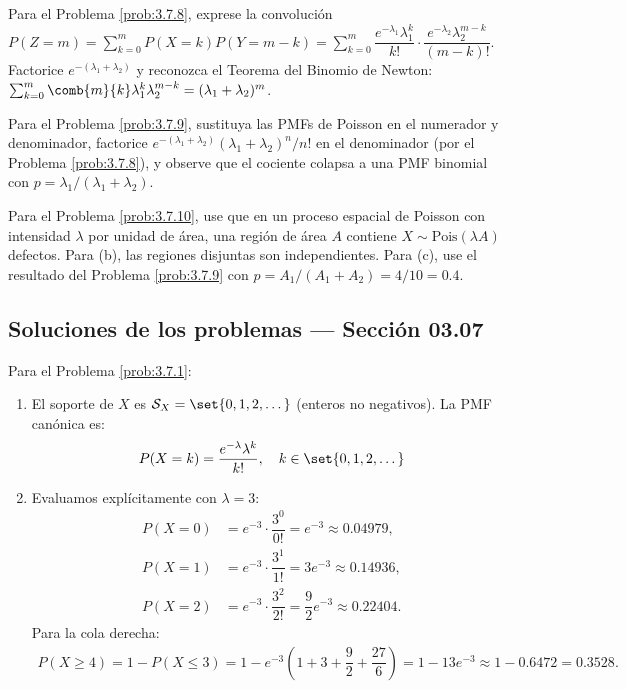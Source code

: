 \begin{sugerencia}
	\label{sug:3.7.8}
	Para el Problema \ref{prob:3.7.8}, exprese la convolución $P(Z = m) = \sum_{k=0}^{m} P(X=k) P(Y=m-k) = \sum_{k=0}^{m} \dfrac{e^{-\lambda_{1}} \lambda_{1}^{k}}{k!} \cdot \dfrac{e^{-\lambda_{2}} \lambda_{2}^{m-k}}{(m-k)!}$. Factorice $e^{-(\lambda_{1}+\lambda_{2})}$ y reconozca el Teorema del Binomio de Newton: $\sum_{k=0}^{m} \comb{m}{k} \lambda_{1}^{k} \lambda_{2}^{m-k} = (\lambda_{1} + \lambda_{2})^{m}$.
\end{sugerencia}

\begin{sugerencia}
	\label{sug:3.7.9}
	Para el Problema \ref{prob:3.7.9}, sustituya las PMFs de Poisson en el numerador y denominador, factorice $e^{-(\lambda_{1}+\lambda_{2})}(\lambda_{1}+\lambda_{2})^{n}/n!$ en el denominador (por el Problema \ref{prob:3.7.8}), y observe que el cociente colapsa a una PMF binomial con $p = \lambda_{1}/(\lambda_{1}+\lambda_{2})$.
\end{sugerencia}

\begin{sugerencia}
	\label{sug:3.7.10}
	Para el Problema \ref{prob:3.7.10}, use que en un proceso espacial de Poisson con intensidad $\lambda$ por unidad de área, una región de área $A$ contiene $X \sim \text{Pois}(\lambda A)$ defectos. Para (b), las regiones disjuntas son independientes. Para (c), use el resultado del Problema \ref{prob:3.7.9} con $p = A_{1}/(A_{1}+A_{2}) = 4/10 = 0.4$.
\end{sugerencia}

\subsection*{Soluciones de los problemas --- Sección 03.07}

\begin{solucion}
	\label{sol:3.7.1}
	Para el Problema \ref{prob:3.7.1}:
	\begin{enumerate}
		\item El soporte de $X$ es $\mathcal{S}_{X} = \set{0, 1, 2, \dots}$ (enteros no negativos). La PMF canónica es:
		\begin{align*}
			P(X = k) = \dfrac{e^{-\lambda} \lambda^{k}}{k!}, \quad k \in \set{0, 1, 2, \dots}
		\end{align*}
		\item Evaluamos explícitamente con $\lambda = 3$:
		\begin{align*}
			P(X = 0) &= e^{-3} \cdot \dfrac{3^{0}}{0!} = e^{-3} \approx 0.04979, \\
			P(X = 1) &= e^{-3} \cdot \dfrac{3^{1}}{1!} = 3 e^{-3} \approx 0.14936, \\
			P(X = 2) &= e^{-3} \cdot \dfrac{3^{2}}{2!} = \dfrac{9}{2} e^{-3} \approx 0.22404.
		\end{align*}
		Para la cola derecha:
		\begin{align*}
			P(X \ge 4) = 1 - P(X \le 3) = 1 - e^{-3}\left(1 + 3 + \dfrac{9}{2} + \dfrac{27}{6}\right) = 1 - 13 e^{-3} \approx 1 - 0.6472 = 0.3528.
		\end{align*}
	\end{enumerate}
\end{solucion}

